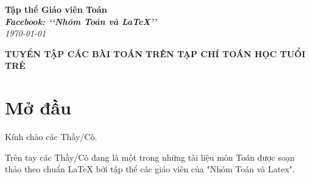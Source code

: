 \documentclass[12pt,a4paper,oneside]{book}
\renewcommand{\baselinestretch}{1.4}
\theoremstyle{nonumberplain}
\begin{document}
	\providecommand*{\dx}{\ensuremath{\mathrm{\,d}}x}
	\providecommand*{\unit}[1]{\ensuremath{\mathrm{\,#1}}}
	
	\begin{titlepage}
		\begin{flushright}
			\fontsize{17}{0}\selectfont
			\textbf{Tập thể Giáo viên Toán}\\
			\textbf{\textit{Facebook: \lq\lq Nhóm Toán và LaTeX\rq\rq}}\\
			\textit{\color{red}\today}
		\end{flushright}
		
		\vspace{4cm}
		
		\begin{flushright}
			
			\vspace{1cm}
			
			\textbf{\fontsize{33}{0}\selectfont T\fontsize{29}{0}\selectfont UYỂN TẬP CÁC BÀI TOÁN TRÊN TẠP CHÍ TOÁN HỌC TUỔI TRẺ}
			
			\vspace{1cm}
			
		\end{flushright}
		
		\vfill{
		}
	\end{titlepage}
	\pagestyle{empty}
	\renewcommand{\headrulewidth}{0.4pt}
	
	{\renewcommand{\baselinestretch}{1.3}
		\tableofcontents
	}
	
	\pagestyle{fancy}
	\lhead{\empty}
	\rhead{\empty}
	\lfoot{\currfilename}
	\chapter*{Mở đầu}
	Kính chào các Thầy/Cô.
	
	\vspace{0.6cm}
	
	\noindent Trên tay các Thầy/Cô đang là một trong những tài liệu môn Toán được soạn thảo theo chuẩn \LaTeX{} bởi tập thể các giáo viên của "Nhóm Toán và Latex".
	
	\vspace{0.6cm}
	
\end{document}
